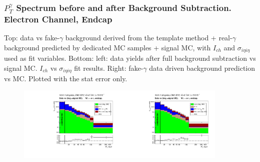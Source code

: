 \begin{frame}
\begin{figure}[htb]
\begin{center}
    \end{center}
  \end{figure}
\end{frame}%

\begin{frame}\frametitle{\footnotesize{$P_T^{\gamma}$ Spectrum before and after Background Subtraction. Electron Channel, Endcap}}
  \tiny{Top: data vs fake-$\gamma$ background derived from the template method + real-$\gamma$ background predicted by dedicated MC samples + signal MC, with $I_{ch}$ and $\sigma_{i\eta{i}\eta}$ used as fit variables. Bottom: left: data yields after full background subtraction vs signal MC. $I_{ch}$ vs $\sigma_{i\eta{i}\eta}$ fit results. Right: fake-$\gamma$ data driven background prediction vs MC. Plotted with the stat error only.}
  \begin{figure}[htb]
    \begin{center}
       \includegraphics[width=0.45\textwidth]{../figs/figs_v11/ELECTRON_WGamma/PrepareYields/c_DATAvsBkgPlusSigMCc_ELECTRON_WGamma_TEMPL_CHISO_UNblind__Endcap__phoEt.pdf}\includegraphics[width=0.45\textwidth]{../figs/figs_v11/ELECTRON_WGamma/PrepareYields/c_DATAvsBkgPlusSigMCc_ELECTRON_WGamma_TEMPL_SIHIH_UNblind__Endcap__phoEt.pdf}\\

\end{center}
\end{figure}
\end{frame}
